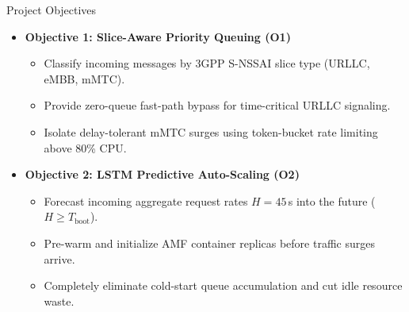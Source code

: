 \documentclass[aspectratio=169,11pt]{beamer}
\begin{document}
\begin{frame}{Project Objectives}
  \begin{itemize}
    \setlength\itemsep{1.4em}
    \item \textbf{Objective 1: Slice-Aware Priority Queuing (O1)}
      \begin{itemize}
        \item Classify incoming messages by 3GPP S-NSSAI slice type (URLLC, eMBB, mMTC).
        \item Provide zero-queue fast-path bypass for time-critical URLLC signaling.
        \item Isolate delay-tolerant mMTC surges using token-bucket rate limiting above 80\% CPU.
      \end{itemize}
    \item \textbf{Objective 2: LSTM Predictive Auto-Scaling (O2)}
      \begin{itemize}
        \item Forecast incoming aggregate request rates $H = 45$\,s into the future ($H \ge T_{\text{boot}}$).
        \item Pre-warm and initialize AMF container replicas before traffic surges arrive.
        \item Completely eliminate cold-start queue accumulation and cut idle resource waste.
      \end{itemize}
  \end{itemize}
\end{frame}
\end{document}
